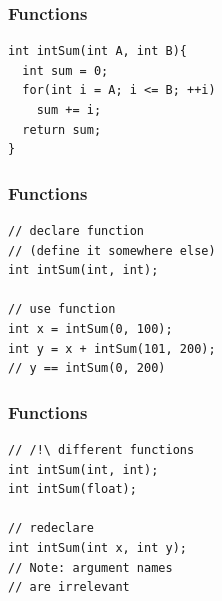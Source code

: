 \begin{frame}[fragile]
\frametitle{Functions}
\begin{lstlisting}
int intSum(int A, int B){
  int sum = 0;
  for(int i = A; i <= B; ++i)
    sum += i;
  return sum;
}
\end{lstlisting}
\end{frame}

\begin{frame}[fragile]
\frametitle{Functions}
\begin{lstlisting}
// declare function
// (define it somewhere else)
int intSum(int, int);

// use function
int x = intSum(0, 100);
int y = x + intSum(101, 200);
// y == intSum(0, 200)
\end{lstlisting}
\end{frame}

\begin{frame}[fragile]
\frametitle{Functions}
\begin{lstlisting}
// /!\ different functions
int intSum(int, int);
int intSum(float);

// redeclare
int intSum(int x, int y);
// Note: argument names
// are irrelevant
\end{lstlisting}
\end{frame}